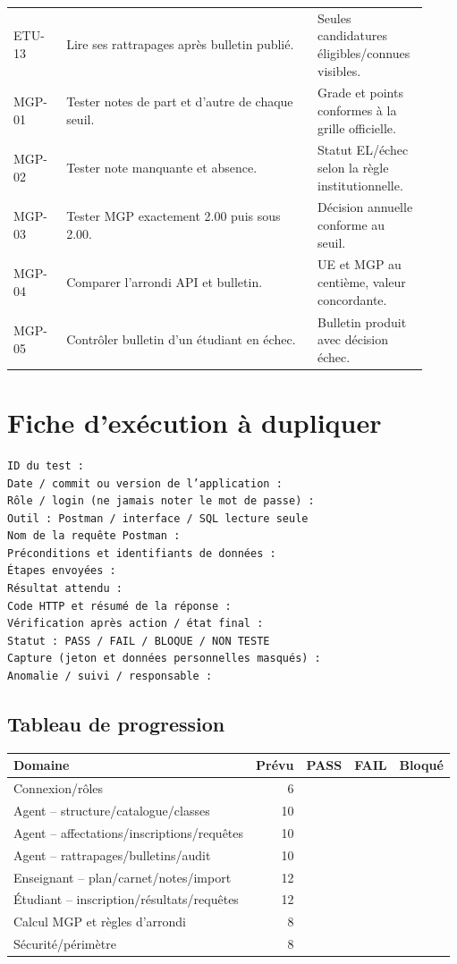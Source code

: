 \documentclass[10pt,a4paper]{article}
\begin{document}
\begin{longtable}{p{0.12\linewidth}p{0.58\linewidth}p{0.22\linewidth}}
ETU-13 & Lire ses rattrapages après bulletin publié. & Seules candidatures éligibles/connues visibles. \\
MGP-01 & Tester notes de part et d’autre de chaque seuil. & Grade et points conformes à la grille officielle. \\
MGP-02 & Tester note manquante et absence. & Statut EL/échec selon la règle institutionnelle. \\
MGP-03 & Tester MGP exactement 2.00 puis sous 2.00. & Décision annuelle conforme au seuil. \\
MGP-04 & Comparer l’arrondi API et bulletin. & UE et MGP au centième, valeur concordante. \\
MGP-05 & Contrôler bulletin d’un étudiant en échec. & Bulletin produit avec décision échec. \\
\bottomrule
\end{longtable}

\section{Fiche d’exécution à dupliquer}

\begin{lstlisting}
ID du test :
Date / commit ou version de l’application :
Rôle / login (ne jamais noter le mot de passe) :
Outil : Postman / interface / SQL lecture seule
Nom de la requête Postman :
Préconditions et identifiants de données :
Étapes envoyées :
Résultat attendu :
Code HTTP et résumé de la réponse :
Vérification après action / état final :
Statut : PASS / FAIL / BLOQUE / NON TESTE
Capture (jeton et données personnelles masqués) :
Anomalie / suivi / responsable :
\end{lstlisting}

\subsection{Tableau de progression}

\begin{center}
\begin{tabularx}{\linewidth}{Xrrrr}
\toprule
Domaine & Prévu & PASS & FAIL & Bloqué \\
\midrule
Connexion/rôles & 6 & & & \\
Agent -- structure/catalogue/classes & 10 & & & \\
Agent -- affectations/inscriptions/requêtes & 10 & & & \\
Agent -- rattrapages/bulletins/audit & 10 & & & \\
Enseignant -- plan/carnet/notes/import & 12 & & & \\
Étudiant -- inscription/résultats/requêtes & 12 & & & \\
Calcul MGP et règles d’arrondi & 8 & & & \\
Sécurité/périmètre & 8 & & & \\
\bottomrule
\end{tabularx}
\end{center}
\end{document}
